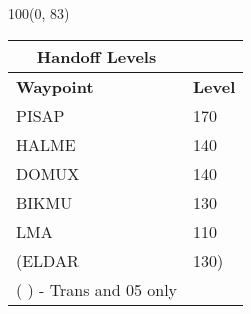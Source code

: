 \documentclass[10pt,landscape,a4paper]{article}
\begin{document}
\begin{textblock}{100}(0, 83)
\begin{table}[]
\begin{tabular}{|l|l|}
\multicolumn{1}{c}{\textbf{Handoff Levels}} \\ \hline
\textbf{Waypoint} & \textbf{Level} \\ \hline
PISAP & 170 \\ 
HALME & 140 \\ 
DOMUX & 140 \\ 
BIKMU & 130 \\ 
LMA & 110  \\
(ELDAR & 130) \\ \hline
\multicolumn{1}{l}{( ) - Trans and 05 only}
\end{tabular}
\end{table}
\end{textblock}
\end{document}
